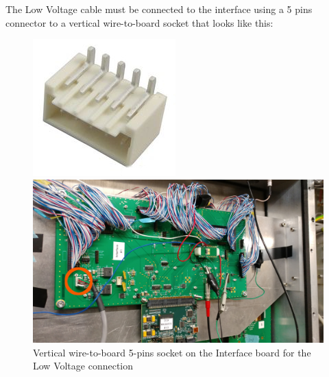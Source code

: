 The Low Voltage cable must be connected to the interface using a 5 pins
connector to a vertical wire-to-board socket that looks like this:
\begin{figure}[H]
  \centering
  \begin{minipage}{0.15\linewidth}
    \centering \includegraphics[width=\linewidth,frame]{low-vol-socket1}
  \end{minipage}%
  \begin{minipage}{0.6\linewidth}
    \centering \includegraphics[width=0.9\linewidth,frame]{low-vol-socket2}
  \end{minipage}
  \caption{Vertical wire-to-board 5-pins socket on the Interface board for the
    Low Voltage connection}\label{low-vol-socket}
\end{figure}
